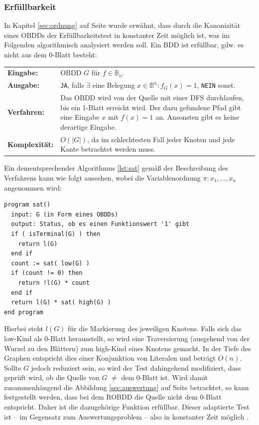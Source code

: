 \subsubsection{Erfüllbarkeit}
\label{sec:erfuellbar}
In Kapitel \ref{sec:ordnung} auf Seite \pageref{sec:ordnung} wurde erwähnt, dass durch die Kanonizität eines OBDDs der Erfüllbarkeitstest in konstanter Zeit möglich ist, was im Folgenden algorithmisch analysiert werden soll. Ein BDD ist erfüllbar, gdw. es nicht aus dem 0-Blatt besteht:\\
\begin{tabular}{l|p{12cm}}
	\textbf{Eingabe:} & OBDD $G$ für $f \in \mathbb{B}_n$. \\ 
	\textbf{Ausgabe:} & \texttt{JA}, falls $\exists$ eine Belegung $x \in \mathbb{B}^n : f_{G}(x) = 1$, \texttt{NEIN} sonst. \\ 
	\textbf{Verfahren:} & Das OBDD wird von der Quelle mit einer DFS durchlaufen, bis ein 1-Blatt erreicht wird. Der dazu gefundene Pfad gibt eine Eingabe $x$ mit $f(x)=1$ an. Ansonsten gibt es keine derartige Eingabe.\\
	\textbf{Komplexität:} & $O(|G|)$, da im schlechtesten Fall jeder Knoten und jede Kante betrachtet werden muss.
\end{tabular}
Ein dementsprechender Algorithmus \ref{lst:sat} gemäß der Beschreibung des Verfahrens kann wie folgt aussehen, wobei die Variablenordnung $\pi : x_1, \dots, x_n$ angenommen wird:
\begin{lstlisting}[frame=htrbl, caption={Implementierung von {\ttfamily sat}}, label={lst:sat}]
program sat()
  input: G (in Form eines OBDDs)
  output: Status, ob es einen Funktionswert '1' gibt
  if ( isTerminal(G) ) then
    return l(G)
  end if
  count := sat( low(G) )
  if (count != 0) then
    return !l(G) * count
  end if
  return l(G) * sat( high(G) )
end program
\end{lstlisting}
Hierbei steht $l(G)$ für die Markierung des jeweiligen Knotens. Falls sich das low-Kind als 0-Blatt herausstellt, so wird eine Traversierung (ausgehend von der Wurzel zu den Blättern) zum high-Kind eines Knotens gemacht. In der Tiefe des Graphen entspricht dies einer Konjunktion von Literalen und beträgt $O(n)$.\\
Sollte $G$ jedoch reduziert sein, so wird der Test dahingehend modifiziert, dass geprüft wird, ob die Quelle von $G$ $\neq$ dem 0-Blatt ist. Wird damit zusammenhängend die Abbildung \ref{sec:auswertung} auf Seite \pageref{sec:auswertung} betrachtet, so kann festgestellt werden, dass bei dem ROBDD die Quelle nicht dem 0-Blatt entspricht. Daher ist die dazugehörige Funktion erfüllbar. Dieser adaptierte Test ist -- im Gegensatz zum Auswertungsproblem -- also in konstanter Zeit möglich \cite[S.37]{s2007}.\\
